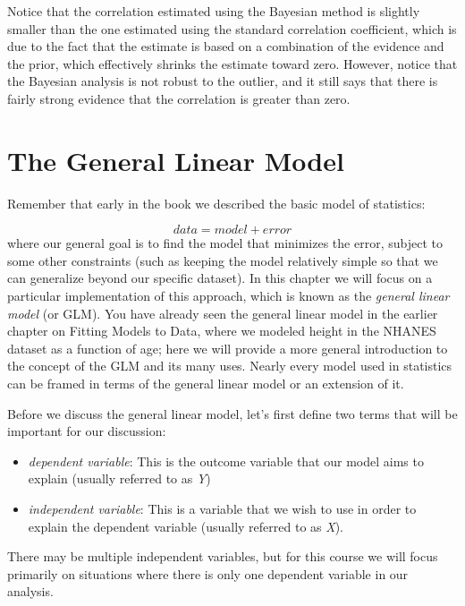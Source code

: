 \documentclass[12pt,]{book}
\providecommand{\tightlist}{%
  \setlength{\itemsep}{0pt}\setlength{\parskip}{0pt}}
\theoremstyle{definition}
\theoremstyle{definition}
\theoremstyle{definition}
\theoremstyle{remark}
\begin{document}
Notice that the correlation estimated using the Bayesian method is slightly smaller than the one estimated using the standard correlation coefficient, which is due to the fact that the estimate is based on a combination of the evidence and the prior, which effectively shrinks the estimate toward zero. However, notice that the Bayesian analysis is not robust to the outlier, and it still says that there is fairly strong evidence that the correlation is greater than zero.

\hypertarget{the-general-linear-model}{%
\chapter{The General Linear Model}\label{the-general-linear-model}}

Remember that early in the book we described the basic model of statistics:

\[
data = model + error
\]
where our general goal is to find the model that minimizes the error, subject to some other constraints (such as keeping the model relatively simple so that we can generalize beyond our specific dataset). In this chapter we will focus on a particular implementation of this approach, which is known as the \emph{general linear model} (or GLM). You have already seen the general linear model in the earlier chapter on Fitting Models to Data, where we modeled height in the NHANES dataset as a function of age; here we will provide a more general introduction to the concept of the GLM and its many uses. Nearly every model used in statistics can be framed in terms of the general linear model or an extension of it.

Before we discuss the general linear model, let's first define two terms that will be important for our discussion:

\begin{itemize}
\tightlist
\item
  \emph{dependent variable}: This is the outcome variable that our model aims to explain (usually referred to as \emph{Y})
\item
  \emph{independent variable}: This is a variable that we wish to use in order to explain the dependent variable (usually referred to as \emph{X}).
\end{itemize}

There may be multiple independent variables, but for this course we will focus primarily on situations where there is only one dependent variable in our analysis.
\end{document}
